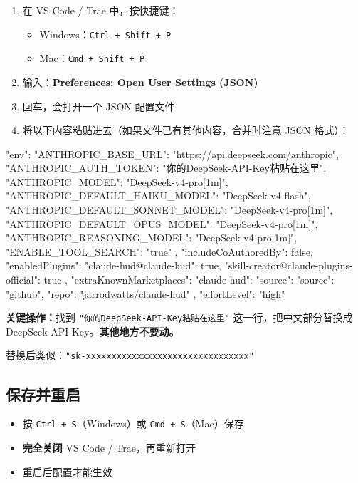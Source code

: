 \documentclass[12pt,a4paper]{ctexart}
\begin{document}
\begin{enumerate}[nosep]
    \item 在 VS Code / Trae 中，按快捷键：
    \begin{itemize}[nosep]
        \item Windows：\texttt{Ctrl + Shift + P}
        \item Mac：\texttt{Cmd + Shift + P}
    \end{itemize}
    \item 输入：\textbf{Preferences: Open User Settings (JSON)}
    \item 回车，会打开一个 JSON 配置文件
    \item 将以下内容粘贴进去（如果文件已有其他内容，合并时注意 JSON 格式）：
\end{enumerate}

\begin{jsoncode}
{
  "env": {
    "ANTHROPIC_BASE_URL": "https://api.deepseek.com/anthropic",
    "ANTHROPIC_AUTH_TOKEN": "你的DeepSeek-API-Key粘贴在这里",
    "ANTHROPIC_MODEL": "DeepSeek-v4-pro[1m]",
    "ANTHROPIC_DEFAULT_HAIKU_MODEL": "DeepSeek-v4-flash",
    "ANTHROPIC_DEFAULT_SONNET_MODEL": "DeepSeek-v4-pro[1m]",
    "ANTHROPIC_DEFAULT_OPUS_MODEL": "DeepSeek-v4-pro[1m]",
    "ANTHROPIC_REASONING_MODEL": "DeepSeek-v4-pro[1m]",
    "ENABLE_TOOL_SEARCH": "true"
  },
  "includeCoAuthoredBy": false,
  "enabledPlugins": {
    "claude-hud@claude-hud": true,
    "skill-creator@claude-plugins-official": true
  },
  "extraKnownMarketplaces": {
    "claude-hud": {
      "source": {
        "source": "github",
        "repo": "jarrodwatts/claude-hud"
      }
    }
  },
  "effortLevel": "high"
}
\end{jsoncode}

\textbf{关键操作：}找到 \texttt{"你的DeepSeek-API-Key粘贴在这里"} 这一行，把中文部分替换成 DeepSeek API Key。\textbf{其他地方不要动。}

替换后类似：\texttt{"sk-xxxxxxxxxxxxxxxxxxxxxxxxxxxxxxxx"}

\subsection{保存并重启}

\begin{itemize}[nosep]
    \item 按 \texttt{Ctrl + S}（Windows）或 \texttt{Cmd + S}（Mac）保存
    \item \textbf{完全关闭} VS Code / Trae，再重新打开
    \item 重启后配置才能生效
\end{itemize}
\end{document}
